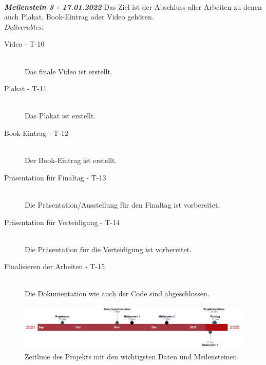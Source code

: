 ~\\

\textit{\textbf{Meilenstein 3 - 17.01.2022}}
Das Ziel ist der Abschluss aller Arbeiten zu denen auch Plakat, Book-Eintrag oder Video gehören.\\
\textit{Deliverables:}
\begin{description}
    \item[Video - T-10]\hfill \\
    Das finale Video ist erstellt.
    \item[Plakat - T-11]\hfill \\
    Das Plakat ist erstellt.
    \item[Book-Eintrag - T-12]\hfill \\
    Der Book-Eintrag ist erstellt.
    \item[Präsentation für Finaltag - T-13]\hfill \\
    Die Präsentation/Ausstellung für den Finaltag ist vorbereitet.
    \item[Präsentation für Verteidigung - T-14]\hfill \\
    Die Präsentation für die Verteidigung ist vorbereitet.
    \item[Finalisieren der Arbeiten - T-15]\hfill \\
    Die Dokumentation wie auch der Code sind abgeschlossen.
\end{description}

\begin{figure}[h!]
    \begin{center}
        \includegraphics[width=1.0\linewidth]{../common/02_goals/resources/timeline.png}
    \end{center}
    \caption{Zeitlinie des Projekts mit den wichtigsten Daten und Meilensteinen.}
    \label{fig:timeline}
\end{figure}


